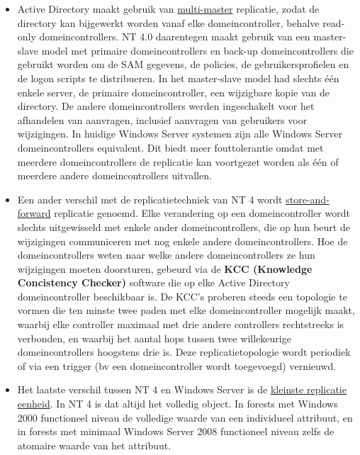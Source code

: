 \begin{enumerate}
		 { 
			\begin{itemize}
				\item Active Directory maakt gebruik van \underline{multi-master} replicatie, zodat de directory kan bijgewerkt worden vanaf elke domeincontroller, behalve read-only domeincontrollers. NT 4.0 daarentegen maakt gebruik van een master-slave model met primaire domeincontrollers en back-up domeincontrollers die gebruikt worden om de SAM gegevens, de policies, de gebruikersprofielen en de logon scripts te distribueren. In het master-slave model had slechts één enkele server, de primaire domeincontroller, een wijzigbare kopie van de directory. De andere domeincontrollers werden ingeschakelt voor het afhandelen van aanvragen, inclusief aanvragen van gebruikers voor wijzigingen. In huidige Windows Server systemen zijn alle Windows Server domeincontrollers equivalent. Dit biedt meer fouttolerantie omdat met meerdere domeincontrollers de replicatie kan voortgezet worden als één of meerdere andere domeincontrollers uitvallen. 
				\item Een ander verschil met de replicatietechniek van NT 4 wordt \underline{store-and-forward} replicatie genoemd. Elke verandering op een domeincontroller wordt slechts uitgewisseld met enkele ander domeincontrollers, die op hun beurt de wijzigingen communiceren met nog enkele andere domeincontrollers. Hoe de domeincontrollers weten naar welke andere domeincontrollers ze hun wijzigingen moeten doorsturen, gebeurd via de \textbf{KCC (Knowledge Concistency Checker)} software die op elke Active Directory domeincontroller beschikbaar is. De KCC's proberen steeds een topologie te vormen die ten minste twee paden met elke domeincontroller mogelijk maakt, waarbij elke controller maximaal met drie andere controllers rechtstreeks is verbonden, en waarbij het aantal hops tussen twee willekeurige domeincontrollers hoogstens drie is. Deze replicatietopologie wordt periodiek of via een trigger (bv een domeincontroller wordt toegevoegd) vernieuwd. 
				\item Het laatste verschil tussen NT 4 en Windows Server is de \underline{kleinste replicatie eenheid}. In NT 4 is dat altijd het volledig object. In forests met Windows 2000 functioneel niveau de volledige waarde van een individueel attribuut, en in forests met minimaal Windows Server 2008 functioneel niveau zelfs de atomaire waarde van het attribuut. 

\end{itemize}}
\end{enumerate}
